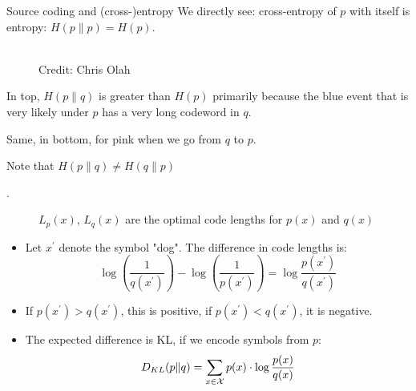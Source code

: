 \documentclass[11pt,compress,t,notes=noshow, xcolor=table]{beamer}
\begin{document}
\begin{vbframe} {Source coding and (cross-)entropy}
We directly see: cross-entropy of $p$ with itself is entropy: $H(p \| p) = H(p)$.
  
\framebreak
  \begin{figure}
    \centering
      \tiny{\\ Credit: Chris Olah}
  \end{figure}
  
  \begin{itemize}
    \item \small{In top, $H(p \| q)$ is greater than $H(p)$ primarily because the blue event that is very likely under $p$ has a very long codeword in $q$.
    \item Same, in bottom, for pink when we go from $q$ to $p$.
    \item Note that $H(p \| q) \neq H(q \| p)$}. 
  \end{itemize}

  \framebreak

  \begin{figure}
    \centering
      \caption{\footnotesize{$L_p(x)$, $L_q(x)$ are the optimal code lengths for $p(x)$ and $q(x)$}}
  \end{figure}
  
  \begin{itemize}
   \item Let $x^\prime$ denote the symbol "dog". The difference in code lengths is:
  $$ \log \left ( \frac{1}{q(x^\prime)} \right ) - \log \left( \frac{1}{p(x^\prime)} \right) = \log \frac{p(x^\prime)}{q(x^\prime)} $$
  
\item If $p(x^\prime) > q(x^\prime)$, this is positive, if $p(x^\prime) < q(x^\prime)$, it is negative. 
    \item The expected difference is KL, if we encode symbols from $p$:
  $$ D_{KL}(p \| q) = \sum_{x \in \mathcal{X}} p(x) \cdot \log \frac{p(x)}{q(x)} $$
  \end{itemize}

\end{vbframe}


\endlecture
\end{document}
